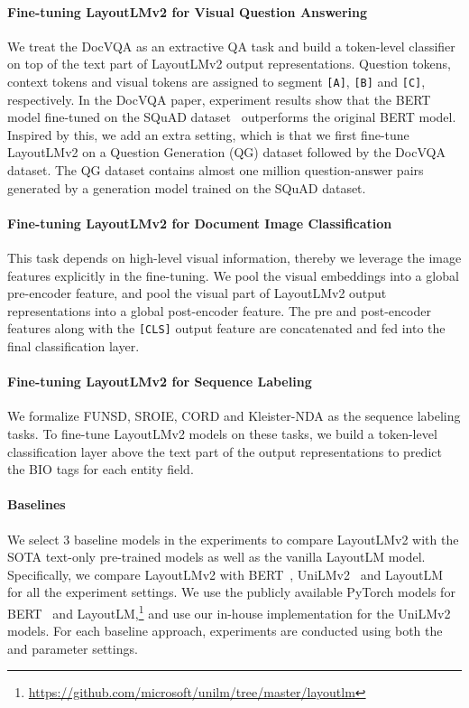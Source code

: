 \documentclass{article} \usepackage{iclr2021_conference,times}
\begin{document}
\paragraph{Fine-tuning LayoutLMv2 for Visual Question Answering}

We treat the DocVQA as an extractive QA task and build a token-level classifier on top of the text part of LayoutLMv2 output representations. Question tokens, context tokens and visual tokens are assigned to segment {\tt[A]}, {\tt[B]} and {\tt[C]}, respectively. In the DocVQA paper, experiment results show that the BERT model fine-tuned on the SQuAD dataset~\citep{rajpurkar-etal-2016-squad} outperforms the original BERT model. Inspired by this, we add an extra setting, which is that we first fine-tune LayoutLMv2 on a Question Generation (QG) dataset followed by the DocVQA dataset. The QG dataset contains almost one million question-answer pairs generated by a generation model trained on the SQuAD dataset.

\paragraph{Fine-tuning LayoutLMv2 for Document Image Classification}

This task depends on high-level visual information, thereby we leverage the image features explicitly in the fine-tuning. We pool the visual embeddings into a global pre-encoder feature, and pool the visual part of LayoutLMv2 output representations into a global post-encoder feature. The pre and post-encoder features along with the {\tt[CLS]} output feature are concatenated and fed into the final classification layer.

\paragraph{Fine-tuning LayoutLMv2 for Sequence Labeling}

We formalize FUNSD, SROIE, CORD and Kleister-NDA as the sequence labeling tasks. To fine-tune LayoutLMv2 models on these tasks, we build a token-level classification layer above the text part of the output representations to predict the BIO tags for each entity field.



\paragraph{Baselines}

We select 3 baseline models in the experiments to compare LayoutLMv2 with the SOTA text-only pre-trained models as well as the vanilla LayoutLM model. Specifically, we compare LayoutLMv2 with BERT~\citep{devlin-etal-2019-bert}, UniLMv2~\citep{bao2020unilmv2} and LayoutLM~\citep{10.1145/3394486.3403172} for all the experiment settings. We use the publicly available PyTorch models for BERT~\citep{wolf-etal-2020-transformers} and LayoutLM,\footnote{\scriptsize \url{https://github.com/microsoft/unilm/tree/master/layoutlm}} and use our in-house implementation for the UniLMv2 models. For each baseline approach, experiments are conducted using both the  and  parameter settings.
\end{document}
